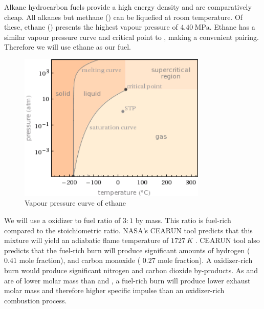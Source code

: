 \documentclass{article}
\begin{document}
Alkane hydrocarbon fuels provide a high energy density and are comparatively cheap. All alkanes but methane () can be liquefied at room temperature. Of these, ethane () presents the highest vapour pressure of $\SI{4.40}{\mega\pascal}$. Ethane has a similar vapour pressure curve and critical point to , making a convenient pairing. Therefore we will use ethane as our fuel.
\begin{figure}[h!]
\centering
\includegraphics[width = 0.8\textwidth]{c2h6_vap.png}
\caption{Vapour pressure curve of ethane} 
\label{c2h6_vap}
\end{figure}
We will use a oxidizer to fuel ratio of $3:1$ by mass. This ratio is fuel-rich compared to the stoichiometric ratio. NASA's CEARUN tool predicts that this mixture will yield an adiabatic flame temperature of $\SI{1727}{K}$ \cite{CEARUN}. CEARUN tool also predicts that the fuel-rich burn will produce significant amounts of hydrogen ($0.41$ mole fraction), and carbon monoxide ( $0.27$ mole fraction). A oxidizer-rich burn would produce significant nitrogen and carbon dioxide by-products. As  and  are of lower molar mass than  and , a fuel-rich burn will produce lower exhaust molar mass and therefore higher specific impulse than an oxidizer-rich combustion process.
\end{document}
